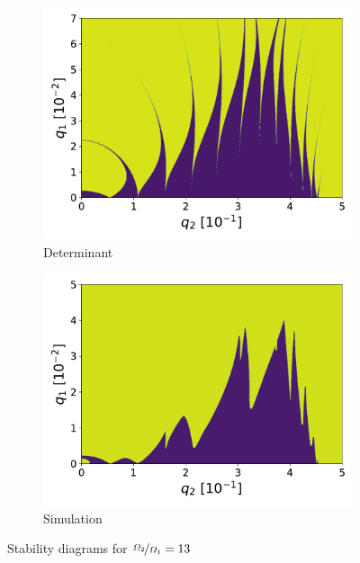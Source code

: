 \begin{figure}[H]
\begin{subfigure}{.5\textwidth}
  \centering
  \includegraphics[width=\linewidth]{img/det_q1_0.0-0.07_q2_0.0-0.5_960x960_13.pdf}
  \caption{Determinant}
  \label{fig:det_13}
\end{subfigure}%
\begin{subfigure}{.5\textwidth}
  \centering
  \includegraphics[width=\linewidth]{img/0_ions_1_electrons_q1_0.0-0.05_q2_0.0-0.5_960x960_13.pdf}  
  \caption{Simulation}
  \label{fig:sim_13}
\end{subfigure}
\caption{Stability diagrams for $\nicefrac{\Omega_2}{\Omega_1} = 13$}
\label{fig:velocityedge-eta=13}
\end{figure}

